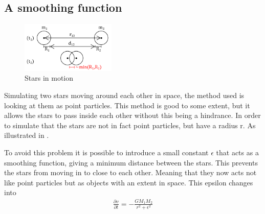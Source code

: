\subsection{A smoothing function}
\label{sec:argumentforepsilon}
\begin{figure}
\begin{center}
\includegraphics[width = 0.4\textwidth]{Figures/argument_for_epsilon.png}
\end{center}
\caption{Stars in motion}
\label{fig:afeps}
\end{figure}

Simulating two stars moving around each other in space, the method used is looking at them as point particles. This method is good to some extent, but it allows the stars to pass inside each other without this being a hindrance. In order to simulate that the stars are not in fact point particles, but have a radius r. As illustrated in .  

To avoid this problem it is possible to introduce a small constant $\epsilon$ that acts as a smoothing function, giving a minimum distance between the stars. This prevents the stars from moving in to close to each other. Meaning that they now acts not like point particles but as objects with an extent in space. This epsilon changes  into 
\begin{align}
 \frac{\partial v}{\partial t} = -\frac{GM_1M_2}{r^2 + \epsilon^2}
\end{align}




